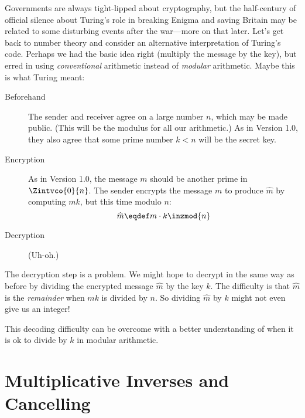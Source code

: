 Governments are always tight-lipped about cryptography, but the
half-century of official silence about Turing's role in breaking
Enigma and saving Britain may be related to some disturbing events
after the war---more on that later.  Let's get back to number theory
and consider an alternative interpretation of Turing's code.  Perhaps
we had the basic idea right (multiply the message by the key), but
erred in using \emph{conventional} arithmetic instead of
\emph{modular} arithmetic.  Maybe this is what Turing meant:
\begin{description}

\item[Beforehand] The sender and receiver agree on a large number $n$,
  which may be made public.  (This will be the modulus for all our
  arithmetic.)  As in Version 1.0, they also agree that some prime
  number $k < n$ will be the secret key.

\item[Encryption] As in Version 1.0, the message $m$ should be another
  prime in $\Zintvco{0}{n}$.  The sender encrypts the message $m$ to produce
    $\widehat{m}$ by computing $mk$, but this time modulo $n$:
\begin{equation}
\widehat{m} \eqdef m \cdot k \inzmod{n}\label{eq:turing-code} 
\end{equation}

\item[Decryption] (Uh-oh.)

\end{description}

The decryption step is a problem.  We might hope to decrypt in the
same way as before by dividing the encrypted message $\widehat{m}$ by the key
$k$.  The difficulty is that $\widehat{m}$ is the \emph{remainder} when $mk$
is divided by $n$.  So dividing $\widehat{m}$ by $k$ might not even give us an
integer!

This decoding difficulty can be overcome with a better understanding
of when it is ok to divide by $k$ in modular arithmetic.

\begin{problems}
\examproblems
{}
\end{problems}

\section{Multiplicative Inverses and Cancelling}\label{sec:inverse}

